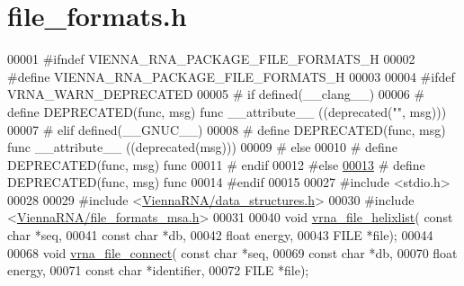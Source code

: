 \hypertarget{file__formats_8h_source}{}\section{file\+\_\+formats.\+h}
\label{file__formats_8h_source}

\begin{DoxyCode}
00001 \textcolor{preprocessor}{#ifndef VIENNA\_RNA\_PACKAGE\_FILE\_FORMATS\_H}
00002 \textcolor{preprocessor}{#define VIENNA\_RNA\_PACKAGE\_FILE\_FORMATS\_H}
00003 
00004 \textcolor{preprocessor}{#ifdef VRNA\_WARN\_DEPRECATED}
00005 \textcolor{preprocessor}{# if defined(\_\_clang\_\_)}
00006 \textcolor{preprocessor}{#  define DEPRECATED(func, msg) func \_\_attribute\_\_ ((deprecated("", msg)))}
00007 \textcolor{preprocessor}{# elif defined(\_\_GNUC\_\_)}
00008 \textcolor{preprocessor}{#  define DEPRECATED(func, msg) func \_\_attribute\_\_ ((deprecated(msg)))}
00009 \textcolor{preprocessor}{# else}
00010 \textcolor{preprocessor}{#  define DEPRECATED(func, msg) func}
00011 \textcolor{preprocessor}{# endif}
00012 \textcolor{preprocessor}{#else}
\mbox{\hyperlink{file__formats_8h_aab347a3c03fbe8e7319551b9fa0cce4a}{00013}} \textcolor{preprocessor}{# define DEPRECATED(func, msg) func}
00014 \textcolor{preprocessor}{#endif}
00015 
00027 \textcolor{preprocessor}{#include <stdio.h>}
00028 
00029 \textcolor{preprocessor}{#include <\mbox{\hyperlink{data__structures_8h}{ViennaRNA/data\_structures.h}}>}
00030 \textcolor{preprocessor}{#include <\mbox{\hyperlink{file__formats__msa_8h}{ViennaRNA/file\_formats\_msa.h}}>}
00031 
00040 \textcolor{keywordtype}{void} \mbox{\hyperlink{group__file__utils_gaaface7db12fadc3d271641c4515ab6e4}{vrna\_file\_helixlist}}( \textcolor{keyword}{const} \textcolor{keywordtype}{char} *seq,
00041                           \textcolor{keyword}{const} \textcolor{keywordtype}{char} *db,
00042                           \textcolor{keywordtype}{float} energy,
00043                           FILE *file);
00044 
00068 \textcolor{keywordtype}{void} \mbox{\hyperlink{group__file__utils_gab69682373ccca1e0e28cc967eec07745}{vrna\_file\_connect}}( \textcolor{keyword}{const} \textcolor{keywordtype}{char} *seq,
00069                         \textcolor{keyword}{const} \textcolor{keywordtype}{char} *db,
00070                         \textcolor{keywordtype}{float} energy,
00071                         \textcolor{keyword}{const} \textcolor{keywordtype}{char} *identifier,
00072                         FILE *file);

\end{DoxyCode}
